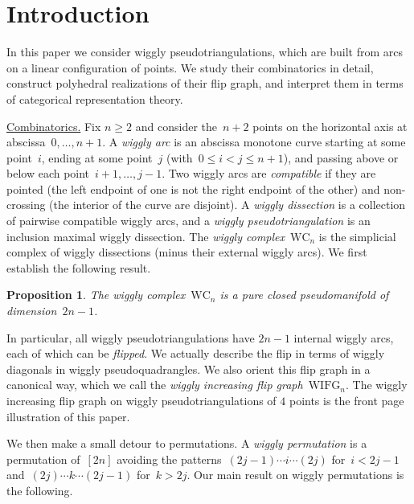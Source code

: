 \documentclass{amsart}
\newtheorem*{proposition*}{Proposition}%
\theoremstyle{definition}
\newcommand{\darkblue}{\color{darkblue}} %
\newcommand{\defn}[1]{\textsl{\darkblue #1}} %
\newcommand{\para}[1]{\smallskip\noindent\uline{#1.}} %
\newcommand{\wigglyComplex}{\mathrm{WC}} %
\newcommand{\wigglyIncreasingFlipGraph}{\mathrm{WIFG}} %
\begin{document}
\tableofcontents


\section{Introduction}

In this paper we consider wiggly pseudotriangulations, which are built from arcs on a linear configuration of points.
We study their combinatorics in detail, construct polyhedral realizations of their flip graph, and interpret them in terms of categorical representation theory.

\bigskip
\para{Combinatorics}
Fix $n \ge 2$ and consider the~$n+2$ points on the horizontal axis at abscissa~${0, \dots, n+1}$.
A \defn{wiggly arc} is an abscissa monotone curve starting at some point~$i$, ending at some point~$j$ (with~${0 \le i < j \le n+1}$), and passing above or below each point~$i+1, \dots, j-1$.
Two wiggly arcs are \defn{compatible} if they are pointed (the left endpoint of one is not the right endpoint of the other) and non-crossing (the interior of the curve are disjoint).
A \defn{wiggly dissection} is a collection of pairwise compatible wiggly arcs, and a \defn{wiggly pseudotriangulation} is an inclusion maximal wiggly dissection.
The \defn{wiggly complex}~$\wigglyComplex_n$ is the simplicial complex of wiggly dissections (minus their external wiggly arcs).
We first establish the following result.

\begin{proposition*}
The wiggly complex~$\wigglyComplex_n$ is a pure closed pseudomanifold of dimension~$2n-1$.
\end{proposition*}

In particular, all wiggly pseudotriangulations have $2n-1$ internal wiggly arcs, each of which can be \defn{flipped}.
We actually describe the flip in terms of wiggly diagonals in wiggly pseudoquadrangles.
We also orient this flip graph in a canonical way, which we call the \defn{wiggly increasing flip graph}~$\wigglyIncreasingFlipGraph_n$.
The wiggly increasing flip graph on wiggly pseudotriangulations of $4$ points is the front page illustration of this paper.

We then make a small detour to permutations.
A \defn{wiggly permutation} is a permutation of~$[2n]$ avoiding the patterns~$(2j-1) \cdots i \cdots (2j)$ for~$i < 2j-1$ and~$(2j) \cdots k \cdots (2j-1)$ for~$k > 2j$.
Our main result on wiggly permutations is the following.
\end{document}
